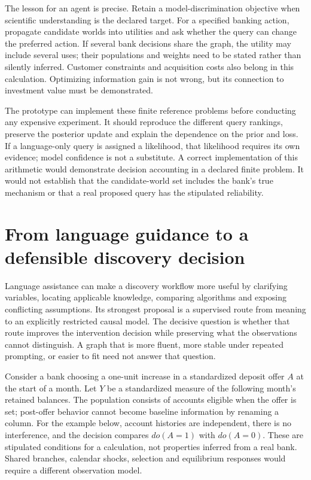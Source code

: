 The lesson for an agent is precise. Retain a model-discrimination objective
when scientific understanding is the declared target. For a specified banking
action, propagate candidate worlds into utilities and ask whether the query
can change the preferred action. If several bank decisions share the graph,
the utility may include several uses; their populations and weights need to
be stated rather than silently inferred. Customer constraints and acquisition
costs also belong in this calculation. Optimizing information gain is not
wrong, but its connection to investment value must be demonstrated.

The prototype can implement these finite reference problems before conducting
any expensive experiment. It should reproduce the different query rankings,
preserve the posterior update and explain the dependence on the prior and
loss. If a language-only query is assigned a likelihood, that likelihood
requires its own evidence; model confidence is not a substitute. A correct
implementation of this arithmetic would demonstrate decision accounting in
a declared finite problem. It would not establish that the candidate-world
set includes the bank's true mechanism or that a real proposed query has the
stipulated reliability.
\label{exec14:l4-final-end}


\hypertarget{exec14:iid-discovery}{%
\section{From language guidance to a defensible discovery
decision}\label{exec14:iid-discovery}}

Language assistance can make a discovery workflow more useful by
clarifying variables, locating applicable knowledge, comparing
algorithms and exposing conflicting assumptions. Its strongest proposal
is a supervised route from meaning to an explicitly restricted causal
model. The decisive question is whether that route improves the
intervention decision while preserving what the observations cannot
distinguish. A graph that is more fluent, more stable under repeated
prompting, or easier to fit need not answer that question.

Consider a bank choosing a one-unit increase in a standardized deposit
offer \(A\) at the start of a month. Let \(Y\) be a standardized measure
of the following month's retained balances. The population consists of
accounts eligible when the offer is set; post-offer behavior cannot
become baseline information by renaming a column. For the example below,
account histories are independent, there is no interference, and the
decision compares \(do(A=1)\) with \(do(A=0)\). These are stipulated
conditions for a calculation, not properties inferred from a real bank.
Shared branches, calendar shocks, selection and equilibrium responses
would require a different observation model.

